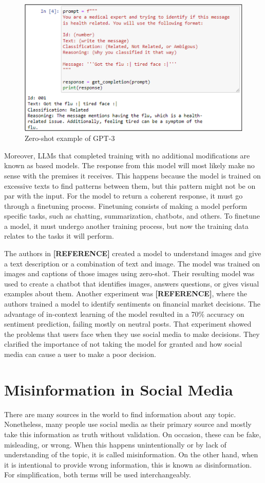  \begin{figure}[!h]
    \centering
        \includegraphics[width=0.9\linewidth]{images/gpt_example.png}
        \caption{Zero-shot example of GPT-3}
        \label{gpt_example}
\end{figure}


Moreover, LLMs that completed training with no additional modifications are known as based models. The response from this model will most likely make no sense with the premises it receives.
This happens because the model is trained on excessive texts to find patterns between them, but this pattern might not be on par with the input. For the model to return a coherent response, it must go
through a finetuning process. Finetuning consists of making a model perform specific tasks, such as chatting, summarization, chatbots, and others. To finetune a model, it must undergo another training process, but now the training data relates to the tasks it will perform. 

The authors in \textbf{[REFERENCE]} created a model to understand images and give a text description or a combination of text and image. The model was trained on images and captions of those
images using zero-shot. Their resulting model was used to create a chatbot that identifies images, answers questions, or gives visual examples about them. Another experiment was \textbf{[REFERENCE]},
where the authors trained a model to identify sentiments on financial market decisions. The advantage of in-context learning of the model resulted in a 70\% accuracy on sentiment prediction,
failing mostly on neutral posts. That experiment showed the problems that users face when they use social media to make decisions. They clarified the importance of not taking the model for granted
and how social media can cause a user to make a poor decision.  


\section{Misinformation in Social Media}
There are many sources in the world to find information about any topic. Nonetheless, many people use social media as their primary source and mostly take this information as truth without
validation. On occasion, these can be fake, misleading, or wrong. When this happens unintentionally or by lack of understanding of the topic, it is called misinformation. On the other hand,
when it is intentional to provide wrong information, this is known as disinformation. For simplification, both terms will be used interchangeably.

